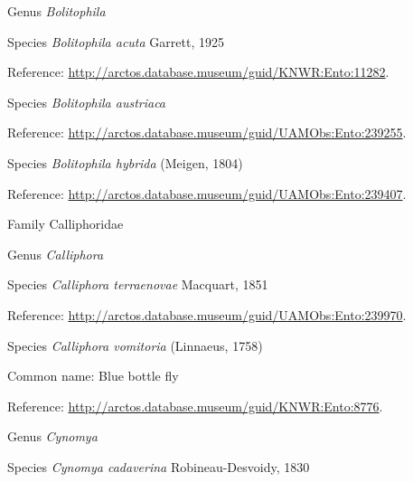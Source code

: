 \documentclass[9pt, article]{memoir}
\begin{document}
\begin{multicols}{2}
\vspace{6pt}\noindent\hspace{30pt}Genus \textit{Bolitophila}


\vspace{6pt}\noindent\hspace{36pt}Species \textit{Bolitophila acuta} Garrett, 1925


Reference: 
\url{http://arctos.database.museum/guid/KNWR:Ento:11282}.

\vspace{6pt}\noindent\hspace{36pt}Species \textit{Bolitophila austriaca}


Reference: 
\url{http://arctos.database.museum/guid/UAMObs:Ento:239255}.

\vspace{6pt}\noindent\hspace{36pt}Species \textit{Bolitophila hybrida} (Meigen, 1804)


Reference: 
\url{http://arctos.database.museum/guid/UAMObs:Ento:239407}.

\vspace{6pt}\noindent\hspace{24pt}Family Calliphoridae


\vspace{6pt}\noindent\hspace{30pt}Genus \textit{Calliphora}


\vspace{6pt}\noindent\hspace{36pt}Species \textit{Calliphora terraenovae} Macquart, 1851


Reference: 
\url{http://arctos.database.museum/guid/UAMObs:Ento:239970}.

\vspace{6pt}\noindent\hspace{36pt}Species \textit{Calliphora vomitoria} (Linnaeus, 1758)


Common name: Blue bottle fly

Reference: 
\url{http://arctos.database.museum/guid/KNWR:Ento:8776}.

\vspace{6pt}\noindent\hspace{30pt}Genus \textit{Cynomya}


\vspace{6pt}\noindent\hspace{36pt}Species \textit{Cynomya cadaverina} Robineau-Desvoidy, 1830



\end{multicols}
\end{document}
